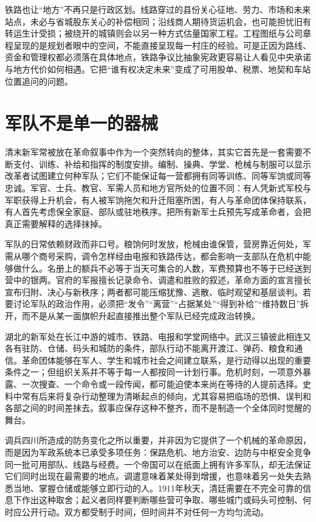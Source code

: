 铁路也让“地方”不再只是行政区划。线路穿过的县份关心征地、劳力、市场和未来站点，未必与省城股东关心的补偿相同；沿线商人期待货运机会，也可能担忧旧有转运生计受损；被绕开的城镇则会以另一种方式估量国家工程。工程图纸与公司章程呈现的是规划者眼中的空间，不能直接呈现每一村庄的经验。可是正因为路线、资金和管理权都必须落在具体地点，铁路争议比抽象宪政更容易让人看见中央承诺与地方代价如何相遇。它把“谁有权决定未来”变成了可用股单、税票、地契和车站位置追问的问题。

\section{军队不是单一的器械}

清末新军常被放在革命叙事中作为一个突然转向的整体，其实它首先是一套需要不断支付、训练、补给和指挥的制度安排。编制、操典、学堂、枪械与制服可以显示改革者试图建立何种军队；它们不能保证每一营都拥有同等训练、同等军饷或同等忠诚。军官、士兵、教官、军需人员和地方官所处的位置不同：有人凭新式军校与军职获得上升机会，有人被军饷拖欠和升迁阻塞所困，有人与革命团体保持联系，有人首先考虑保全家庭、部队或驻地秩序。把所有新军士兵预先写成革命者，会把真正需要解释的选择抹掉。

军队的日常依赖财政而非口号。粮饷何时发放，枪械由谁保管，营房靠近何处，军需从哪个商号采购，调令怎样经由电报和铁路传达，都会影响一支部队在危机中能够做什么。名册上的额兵不必等于当天可集合的人数，军费预算也不等于已经送到营中的银两。官府的军报擅长记录命令、调遣和胜败的叙述，革命方面的宣言擅长宣布归附、决心与新秩序；两者都可能压缩犹豫、逃散、临时观望和基层谈判。若要讨论军队的政治作用，必须把“发令”“离营”“占据某处”“得到补给”“维持数日”拆开，而不是从某一面旗帜升起直接推出整个军队已经完成政治转换。

湖北的新军处在长江中游的城市、铁路、电报和学堂网络中。武汉三镇彼此相连又各有驻防、仓储、码头和城防的条件，部队行动不能离开渡江、弹药、粮食和通信。革命团体能够在军人、学生和城市社会之间建立联系，是行动得以出现的重要条件之一；但组织关系并不等于每一人都按同一计划行事。危机时刻，一项意外暴露、一次搜查、一个命令或一段传闻，都可能迫使本来尚在等待的人提前选择。史料中常有后来将复杂行动整理为清晰起点的倾向，尤其容易把临场的恐惧、误判和各部之间的时间差抹去。叙事应保存这种不整齐，而不是制造一个全体同时觉醒的舞台。

调兵四川所造成的防务变化之所以重要，并非因为它提供了一个机械的革命原因，而是因为军政系统本已承受多项任务：保路危机、地方治安、边防与中枢安全竞争同一批可用部队、线路与经费。一个帝国可以在纸面上拥有许多军队，却无法保证它们同时出现在最需要的地点。调遣意味着某处得到增援，也意味着另一处失去熟悉当地、掌握仓储或能够立即行动的人。1911年秋天，清廷需要在不完全可靠的信息下作出这种取舍；起义者同样要判断哪些营可争取、哪些城门或码头可控制、何时应公开行动。双方都受制于时间，但时间并不对任何一方均匀流动。

